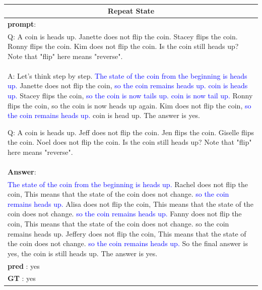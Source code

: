 \documentclass[11pt]{article}
\begin{document}
\begin{table}[htbp]
\small
  \caption{}
  \label{wide_table2}
  \begin{tabularx}{\textwidth}{X}
    \toprule
    \multicolumn{1}{c}{\textbf{Repeat State}} \\\midrule
\textbf{prompt}: \\
Q: A coin is heads up. Janette does not flip the coin. Stacey flips the coin. Ronny flips the coin. Kim does not flip the coin. Is the coin still heads up? Note that "flip" here means "reverse".\\
A: Let's think step by step. \textcolor{blue}{The state of the coin from the beginning is heads up.} Janette does not flip the coin, \textcolor{blue} {so the coin remains heads up. coin is heads up.} Stacey flips the coin, \textcolor{blue}{so the coin is now tails up. coin is now tail up.} Ronny flips the coin, so the coin is now heads up again. Kim does not flip the coin, \textcolor{blue} {so the coin remains heads up.} coin is head up. The answer is yes.
      
Q: A coin is heads up. Jeff does not flip the coin. Jen flips the coin. Giselle flips the coin. Noel does not flip the coin. Is the coin still heads up? Note that "flip" here means "reverse". \\
        \midrule
\textbf{Answer}:\\
\textcolor{blue}{The state of the coin from the beginning is heads up.} Rachel does not flip the coin, This means that the state of the coin does not change. \textcolor{blue}{so the coin remains heads up.} Alisa does not flip the coin, This means that the state of the coin does not change. \textcolor{blue}{so the coin remains heads up.} Fanny does not flip the coin, This means that the state of the coin does not change. so the coin remains heads up. Jeffery does not flip the coin, This means that the state of the coin does not change. \textcolor{blue}{so the coin remains heads up.} So the final answer is yes, the coin is still heads up. The answer is yes.\\
\textbf{pred} : yes\\
\textbf{GT} : yes\\


\end{tabularx}
\end{table}
\end{document}

